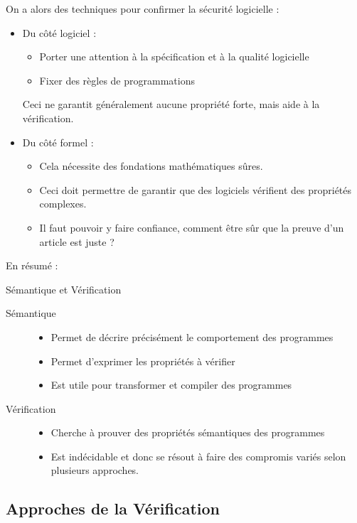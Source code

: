 \documentclass{cours}
\begin{document}
On a alors des techniques pour confirmer la sécurité logicielle :
\begin{itemize}
	\item Du côté logiciel :
	      \begin{itemize}
		      \item Porter une attention à la spécification et à la qualité logicielle
		      \item Fixer des règles de programmations
	      \end{itemize}
	      Ceci ne garantit généralement aucune propriété forte, mais aide à la vérification.
	\item Du côté formel :
	      \begin{itemize}
		      \item Cela nécessite des fondations mathématiques sûres.
		      \item Ceci doit permettre de garantir que des logiciels vérifient des propriétés complexes.
		      \item Il faut pouvoir y faire confiance, comment être sûr que la preuve d'un article est juste ?
	      \end{itemize}
\end{itemize}
En résumé :
\begin{définition}{Sémantique et Vérification}{}
\begin{description}
	\item[Sémantique] \begin{itemize}
		      \item Permet de décrire précisément le comportement des programmes
		      \item Permet d'exprimer les propriétés à vérifier
		      \item Est utile pour transformer et compiler des programmes
	      \end{itemize}
	\item[Vérification] \begin{itemize}
		      \item Cherche à prouver des propriétés sémantiques des programmes
		      \item Est indécidable et donc se résout à faire des compromis variés selon plusieurs approches.
	      \end{itemize}
\end{description}
\end{définition}

\subsection{Approches de la Vérification}
\end{document}
